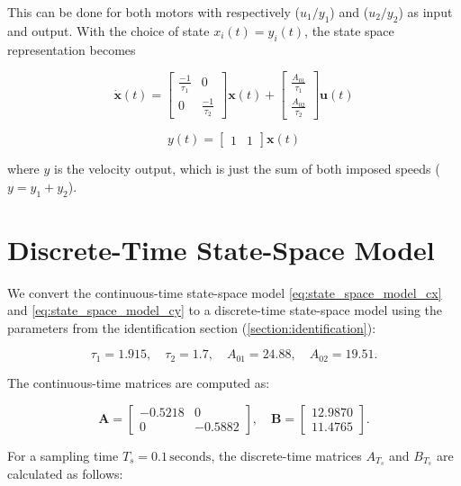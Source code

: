 This can be done for both motors with respectively ($u_1/y_1$) and ($u_2/y_2$) as input and output. With the choice of 
state $x_i(t) = y_i(t)$, the state space representation becomes

\begin{equation}
    \dot{\mathbf{x}}(t) = \begin{bmatrix}
    \frac{-1}{\tau_1} & 0 \\ 
    0 & \frac{-1}{\tau_2}
    \end{bmatrix} \mathbf{x}(t) + \begin{bmatrix} 
    \frac{A_{01}}{\tau_1} \\ 
    \frac{A_{02}}{\tau_2} 
    \end{bmatrix}\mathbf{u}(t)
    \label{eq:state_space_model_cx}
\end{equation}

\begin{equation}
    y(t) = \begin{bmatrix} 1 & 1 \end{bmatrix}\mathbf{x}(t)
    \label{eq:state_space_model_cy}
\end{equation}

where \( y \) is the velocity output, which is just the sum of both imposed speeds ($y = y_1 + y_2$).

\section{Discrete-Time State-Space Model}
We convert the continuous-time state-space model \eqref{eq:state_space_model_cx} and \eqref{eq:state_space_model_cy} to 
a discrete-time state-space model using the parameters from the identification section (\ref{section:identification}):

\[
\tau_1 = 1.915, \quad \tau_2 = 1.7, \quad A_{01} = 24.88, \quad A_{02} = 19.51.
\]

The continuous-time matrices are computed as:

\[
\mathbf{A} = 
\begin{bmatrix}
-0.5218 & 0 \\
0 & -0.5882
\end{bmatrix}, \quad 
\mathbf{B} = 
\begin{bmatrix}
12.9870 \\
11.4765
\end{bmatrix}.
\]

For a sampling time \( T_s = 0.1 \, \text{seconds} \), the discrete-time matrices \( A_{T_s} \) and \( B_{T_s} \) are calculated as follows:

